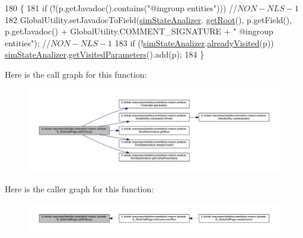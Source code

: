 \begin{DoxyCode}
180                                          \{
181         \textcolor{keywordflow}{if} (!(p.getJavadoc().contains(\textcolor{stringliteral}{"@ingroup entities"}))) \textcolor{comment}{//$NON-NLS-1$}
182             GlobalUtility.setJavadocToField(\hyperlink{classit_1_1isislab_1_1masonassisteddocumentation_1_1mason_1_1wizards_1_1_g___grids_cell_page_a7880d671931d7229eb3d46f54fcc5697}{simStateAnalizer}.
      \hyperlink{classit_1_1isislab_1_1masonassisteddocumentation_1_1mason_1_1analizer_1_1_sim_state_analizer_ad271c4ee4ffe808dcaa5fecc39cb7bd4}{getRoot}(), p.getField(), p.getJavadoc() + GlobalUtility.COMMENT\_SIGNATURE + \textcolor{stringliteral}{" @ingroup entities"}); \textcolor{comment}{
      //$NON-NLS-1$}
183         \textcolor{keywordflow}{if} (!\hyperlink{classit_1_1isislab_1_1masonassisteddocumentation_1_1mason_1_1wizards_1_1_g___grids_cell_page_a7880d671931d7229eb3d46f54fcc5697}{simStateAnalizer}.\hyperlink{classit_1_1isislab_1_1masonassisteddocumentation_1_1mason_1_1analizer_1_1_sim_state_analizer_a0a0e3dd3cbc27027c93a4f935382ac55}{alreadyVisited}(p))  
      \hyperlink{classit_1_1isislab_1_1masonassisteddocumentation_1_1mason_1_1wizards_1_1_g___grids_cell_page_a7880d671931d7229eb3d46f54fcc5697}{simStateAnalizer}.\hyperlink{classit_1_1isislab_1_1masonassisteddocumentation_1_1mason_1_1analizer_1_1_sim_state_analizer_a9fb2508f0bb14958d8aa2e409ae41f8d}{getVisitedParameters}().add(p);     
184     \}
\end{DoxyCode}


Here is the call graph for this function\-:\nopagebreak
\begin{figure}[H]
\begin{center}
\leavevmode
\includegraphics[width=350pt]{classit_1_1isislab_1_1masonassisteddocumentation_1_1mason_1_1wizards_1_1_g___grids_cell_page_a874d5aab262342b54eb0bd9ea0e576ab_cgraph}
\end{center}
\end{figure}




Here is the caller graph for this function\-:\nopagebreak
\begin{figure}[H]
\begin{center}
\leavevmode
\includegraphics[width=350pt]{classit_1_1isislab_1_1masonassisteddocumentation_1_1mason_1_1wizards_1_1_g___grids_cell_page_a874d5aab262342b54eb0bd9ea0e576ab_icgraph}
\end{center}
\end{figure}


